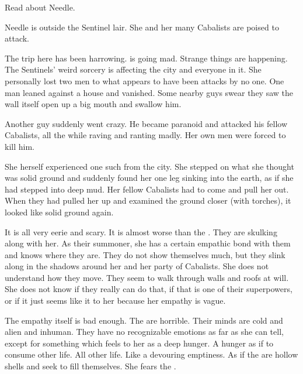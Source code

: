 







\begin{comment}
  \section{Needle thinks}
\end{comment}
Read about Needle. 

Needle is outside the Sentinel lair.
She and her many Cabalists are poised to attack. 

The trip here has been harrowing. 
\Malcur is going mad. 
Strange things are happening. 
The Sentinels' weird sorcery is affecting the city and everyone in it.
She personally lost two men to what appears to have been attacks by no one.
One man leaned against a house and vanished. 
Some nearby guys swear they saw the wall itself open up a big mouth and swallow him. 

Another guy suddenly went crazy. 
He became paranoid and attacked his fellow Cabalists, all the while raving and ranting madly.
Her own men were forced to kill him. 

She herself experienced one such  from the city. 
She stepped on what she thought was solid ground and suddenly found her one leg sinking into the earth, as if she had stepped into deep mud. 
Her fellow Cabalists had to come and pull her out. 
When they had pulled her up and examined the ground closer (with torches), it looked like solid ground again. 

It is all very eerie and scary. 
It is almost worse than the \banes. 
They are skulking along with her.
As their summoner, she has a certain empathic bond with them and knows where they are. 
They do not show themselves much, but they slink along in the shadows around her and her party of Cabalists. 
She does not understand how they move.
They seem to walk through walls and roofs at will. 
She does not know if they really can do that, if that is one of their superpowers, or if it just seems like it to her because her empathy is vague.

The empathy itself is bad enough. 
The \banes are horrible. 
Their minds are cold and alien and inhuman.
They have no recognizable emotions as far as she can tell, except for something which feels to her as a deep hunger. 
A hunger as if to consume other life.
All other life. 
Like a devouring emptiness.
As if the \banes are hollow shells and seek to fill themselves. 
She fears the \banes. 

